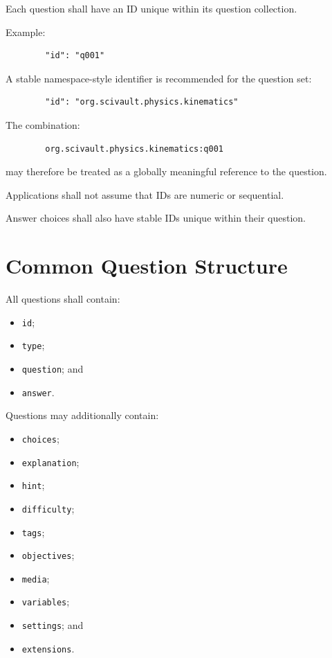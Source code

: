 \documentclass[11pt]{article}
\begin{document}
	Each question shall have an ID unique within its question collection.
	
	Example:
	
	\begin{lstlisting}
		"id": "q001"
	\end{lstlisting}
	
	A stable namespace-style identifier is recommended for the question set:
	
	\begin{lstlisting}
		"id": "org.scivault.physics.kinematics"
	\end{lstlisting}
	
	The combination:
	
	\begin{lstlisting}
		org.scivault.physics.kinematics:q001
	\end{lstlisting}
	
	may therefore be treated as a globally meaningful reference to the
	question.
	
	Applications shall not assume that IDs are numeric or sequential.
	
	Answer choices shall also have stable IDs unique within their question.
	
	\section{Common Question Structure}
	
	All questions shall contain:
	
	\begin{itemize}
		\item \texttt{id};
		\item \texttt{type};
		\item \texttt{question}; and
		\item \texttt{answer}.
	\end{itemize}
	
	Questions may additionally contain:
	
	\begin{itemize}
		\item \texttt{choices};
		\item \texttt{explanation};
		\item \texttt{hint};
		\item \texttt{difficulty};
		\item \texttt{tags};
		\item \texttt{objectives};
		\item \texttt{media};
		\item \texttt{variables};
		\item \texttt{settings}; and
		\item \texttt{extensions}.
	\end{itemize}
	
\end{document}
